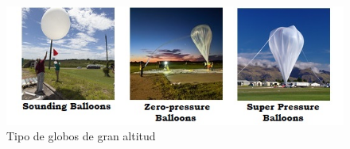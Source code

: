 \begin{figure}[!ht]
    \centering
    \includegraphics[width=0.9\linewidth]{document/figures/01_type_ballons.jpg}
    \caption{Tipo de globos de gran altitud}
    \label{fig:type_balloons}
\end{figure}

